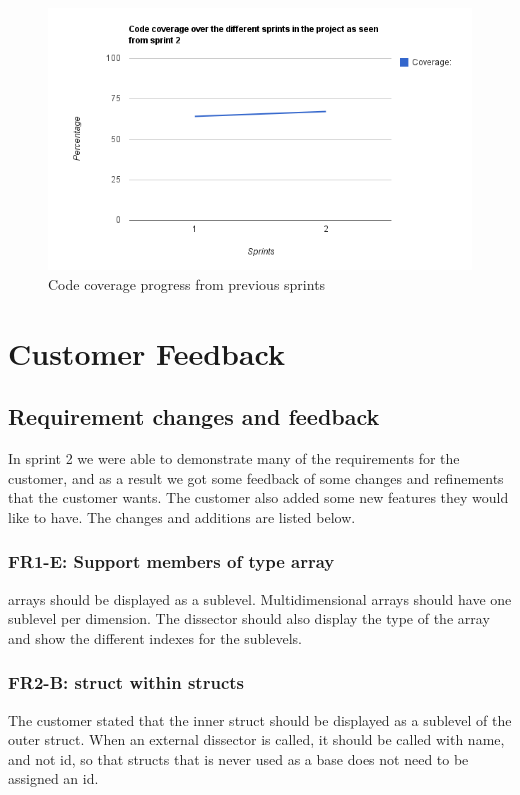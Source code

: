 \begin{figure}[ht]
	\center
	\includegraphics[width=\textwidth]{./sprints/img/sprint2_code_coverage_chart}
	\caption{Code coverage progress from previous sprints\label{fig:sp2CoverageChart}}
\end{figure}


 


\section{Customer Feedback}
\label{sec:sp2:feedback}
\subsection{Requirement changes and feedback}
In sprint 2 we were able to demonstrate many of the requirements for the customer, and as a result we got some feedback of some changes and refinements that the customer wants. The customer also added some new features they would like to have. The changes and additions are listed below.

\subsubsection{FR1-E: Support \glspl{member} of type \gls{array}}
\Glspl{array} should be displayed as a sublevel. Multidimensional \glspl{array} should have one sublevel per dimension. The \gls{dissector} should also display the type of the \gls{array} and show the different indexes for the sublevels.

\subsubsection{FR2-B: \gls{struct} within \glspl{struct}}
The customer stated that the inner \gls{struct} should be displayed as a sublevel of the outer \gls{struct}.
When an external \gls{dissector} is called, it should be called with name, and not id, so that \glspl{struct} that is never used as a base does not need to be assigned an id.

